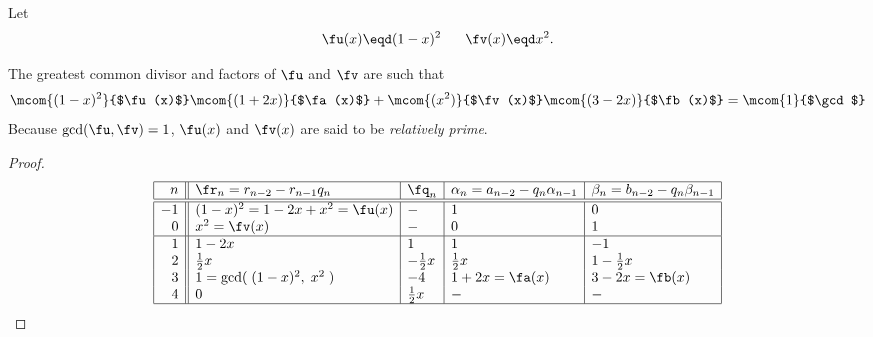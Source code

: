 \begin{example}
\label{ex:eea_n=2}
Let 
  \[ \fu(x)\eqd (1-x)^2  \hspace{4ex} \fv(x)\eqd x^2. \]

The greatest common divisor and factors of $\fu$ and $\fv$ are such that
\[ 
   \mcom{(1-x)^2}{$\fu(x)$} \mcom{(1+2x)}{$\fa(x)$}   +
   \mcom{(x^2)  }{$\fv(x)$} \mcom{(3-2x)}{$\fb(x)$} = 
   \mcom{1}{$\gcd$}
\]
Because $\gcd(\fu,\fv)=1$, $\fu(x)$ and $\fv(x)$ are said to be 
{\em relatively prime}.
\end{example}
\begin{proof}
\[\begin{array}{|r||l|l|l|l|}
  \hline
  n  & \fr_n=r_{n-2}-r_{n-1}q_n  & \fq_n   & \alpha_n=a_{n-2}-q_n \alpha_{n-1} & \beta_n=b_{n-2}-q_n \beta_{n-1}  \\
  \hline
  \hline
  -1  & (1-x)^2=1-2x+x^2 = \fu(x)
      & - 
      & 1 
      & 0  
      \\
   0  & x^2 = \fv(x)
      & - 
      & 0 
      & 1  
      \\
  \hline
   1  & 1-2x
      &  1  
      &  1
      & -1
      \\
   2  &  \frac{1}{2}x 
      & -\frac{1}{2}x
      &  \frac{1}{2}x
      & 1-\frac{1}{2}x
      \\
   3  & 1    = \gcd(\;(1-x)^2,\;x^2\;)
      & -4
      & 1+2x = \fa(x)
      & 3-2x = \fb(x)
      \\
   4  & 0
      & \frac{1}{2}x
      & -
      & -
      \\
  \hline
\end{array}\]
\end{proof}







